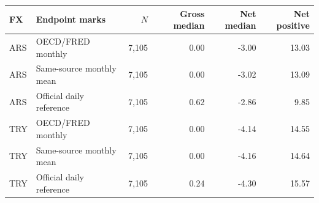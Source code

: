 \begin{tabular}{llrrrr}
\toprule
FX & Endpoint marks & $N$ & Gross median & Net median & Net positive \\
\midrule
ARS & OECD/FRED monthly & 7,105 & 0.00 & -3.00 & 13.03 \\
ARS & Same-source monthly mean & 7,105 & 0.00 & -3.02 & 13.09 \\
ARS & Official daily reference & 7,105 & 0.62 & -2.86 & 9.85 \\
TRY & OECD/FRED monthly & 7,105 & 0.00 & -4.14 & 14.55 \\
TRY & Same-source monthly mean & 7,105 & 0.00 & -4.16 & 14.64 \\
TRY & Official daily reference & 7,105 & 0.24 & -4.30 & 15.57 \\
\bottomrule
\end{tabular}
